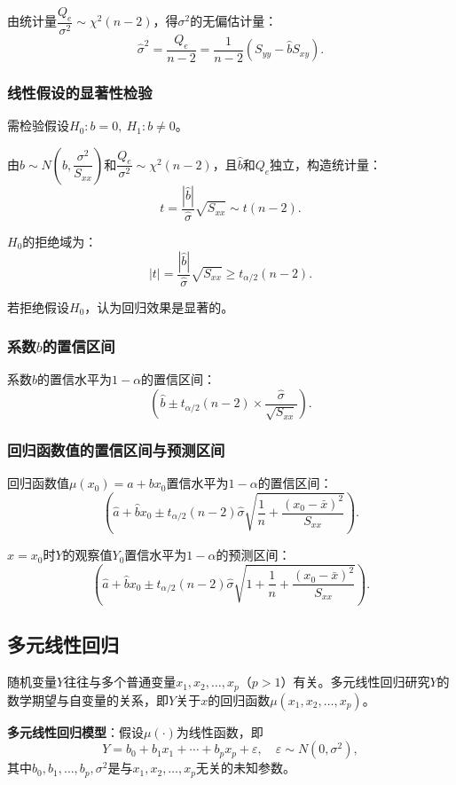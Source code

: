 \documentclass[11pt,a4paper]{report}
\theoremstyle{definition}
\theoremstyle{plain}
\begin{document}
由统计量$\dfrac{Q_e}{\sigma^2}\sim\chi^2(n-2)$，得$\sigma^2$的无偏估计量：
\[
\hat{\sigma}^2=\frac{Q_e}{n-2}=\frac{1}{n-2}(S_{yy}-\hat{b}S_{xy}).
\]

\subsubsection{线性假设的显著性检验}

需检验假设$H_0:b=0,\ H_1:b\neq 0$。

由$\hat{b}\sim N\left(b,\dfrac{\sigma^2}{S_{xx}}\right)$和$\dfrac{Q_e}{\sigma^2}\sim\chi^2(n-2)$，且$\hat{b}$和$Q_e$独立，构造统计量：
\[
t=\frac{|\hat{b}|}{\hat{\sigma}}\sqrt{S_{xx}}\sim t(n-2).
\]

$H_0$的拒绝域为：
\[
|t|=\frac{|\hat{b}|}{\hat{\sigma}}\sqrt{S_{xx}}\geq t_{\alpha/2}(n-2).
\]

若拒绝假设$H_0$，认为回归效果是显著的。

\subsubsection{系数$b$的置信区间}

系数$b$的置信水平为$1-\alpha$的置信区间：
\[
\left(\hat{b}\pm t_{\alpha/2}(n-2)\times\frac{\hat{\sigma}}{\sqrt{S_{xx}}}\right).
\]

\subsubsection{回归函数值的置信区间与预测区间}

回归函数值$\mu(x_0)=a+bx_0$置信水平为$1-\alpha$的置信区间：
\[
\left(\hat{a}+\hat{b}x_0\pm t_{\alpha/2}(n-2)\hat{\sigma}\sqrt{\frac{1}{n}+\frac{(x_0-\bar{x})^2}{S_{xx}}}\right).
\]

$x=x_0$时$Y$的观察值$Y_0$置信水平为$1-\alpha$的预测区间：
\[
\left(\hat{a}+\hat{b}x_0\pm t_{\alpha/2}(n-2)\hat{\sigma}\sqrt{1+\frac{1}{n}+\frac{(x_0-\bar{x})^2}{S_{xx}}}\right).
\]

\subsection{多元线性回归}

随机变量$Y$往往与多个普通变量$x_1,x_2,\ldots,x_p$（$p>1$）有关。多元线性回归研究$Y$的数学期望与自变量的关系，即$Y$关于$x$的回归函数$\mu(x_1,x_2,\ldots,x_p)$。

\textbf{多元线性回归模型}：假设$\mu(\cdot)$为线性函数，即
\[
Y=b_0+b_1x_1+\cdots+b_px_p+\varepsilon,\quad \varepsilon\sim N(0,\sigma^2),
\]
其中$b_0,b_1,\ldots,b_p,\sigma^2$是与$x_1,x_2,\ldots,x_p$无关的未知参数。
\end{document}
